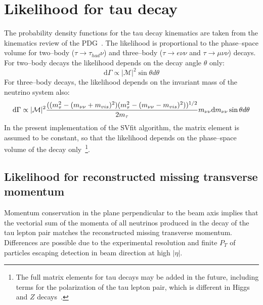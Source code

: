 \section{Likelihood for tau decay}

The probability density functions for the tau decay kinematics are taken from
the kinematics review of the PDG~\cite{PDG}.  The likelihood is proportional to
the phase--space volume for two--body ($\tau \to \tau_{had} \nu$) and
three--body ($\tau \to e \nu\nu$ and $\tau \to \mu \nu\nu$) decays.  For
two--body decays the likelihood depends on the decay angle $\theta$ only:
\begin{equation*}
\mathrm{d}\Gamma \propto |\mathcal{M}|^2 \sin \theta d \theta
\label{eq:pdfKineHadronic}
\end{equation*}
For three--body decays, the likelihood depends on the invariant mass of the
neutrino system also:
\begin{equation}
\mathrm{d}\Gamma \propto |\mathcal{M}|^2 
\frac{((m_{\tau}^2 - (m_{\nu\nu} + m_{vis})^2)(m_{\tau}^2 - (m_{\nu\nu} - m_{vis})^2))^{1/2}}
{2 m_{\tau}} 
m_{\nu\nu}
\mathrm{d}m_{\nu\nu}
\sin \theta d\theta 
\label{eq:pdfKineLeptonic}
\end{equation}
In the present implementation of the SVfit algorithm, the matrix element is
assumed to be constant, so that the likelihood depends on the phase--space
volume of the decay only~\footnote{The full matrix elements for tau decays may
be added in the future, including terms for the polarization of the tau lepton
pair, which is different in Higgs and $Z$ decays~\cite{tauDecayPolarization}.
}.


\subsection{Likelihood for reconstructed missing transverse momentum}

Momentum conservation in the plane perpendicular to the beam axis implies that
the vectorial sum of the momenta of all neutrinos produced in the decay of the
tau lepton pair matches the reconstructed missing transverse momentum.
Differences are possible due to the experimental resolution and finite $P_{T}$
of particles escaping detection in beam direction at high $\left| \eta \right|$.

